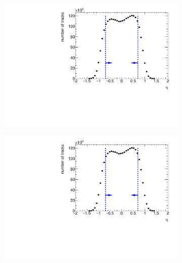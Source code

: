 \captionsetup{format=plain,indention=0pt,justification=justified}
\begin{figure}[h!]
	\centering
	\begin{subfigure}{.45\textwidth}
	\includegraphics[width=\textwidth, page=8]{chapters/chrgSTAR/img/selection/SDT.pdf}
	\end{subfigure}
	\begin{subfigure}{.45\textwidth}
	\includegraphics[width=\textwidth, page=7]{chapters/chrgSTAR/img/selection/SDT.pdf}
	\end{subfigure}
	\begin{subfigure}{.45\textwidth}

\end{subfigure}
\end{figure}
